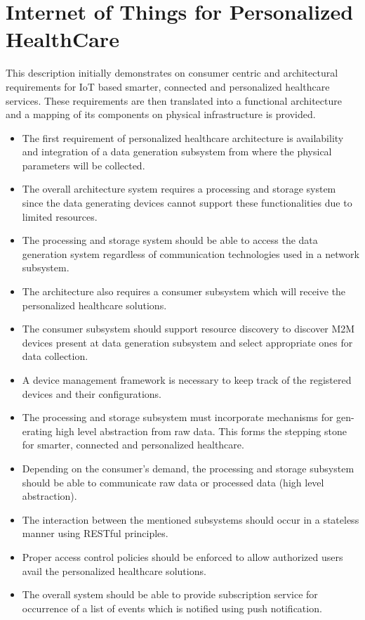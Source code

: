 \section{Internet of Things for Personalized HealthCare}
This description initially demonstrates on consumer centric and architectural
requirements for IoT based smarter, connected and personalized healthcare services.
These requirements are then translated into a functional architecture and a mapping
of its components on physical infrastructure is provided.
\begin{itemize}
\item The first requirement of personalized healthcare architecture is availability and
integration of a data generation subsystem from where the physical parameters
will be collected.
\item  The overall architecture system requires a processing and storage system since
the data generating devices cannot support these functionalities due to limited
resources.
\item  The processing and storage system should be able to access the data generation
system regardless of communication technologies used in a network subsystem.
\item  The architecture also requires a consumer subsystem which will receive the
personalized healthcare solutions.
\item  The consumer subsystem should support resource discovery to discover M2M
devices present at data generation subsystem and select appropriate ones for data
collection.
\item  A device management framework is necessary to keep track of the registered
devices and their configurations.
\item  The processing and storage subsystem must incorporate mechanisms for gen-
erating high level abstraction from raw data. This forms the stepping stone for
smarter, connected and personalized healthcare.
\item  Depending on the consumer’s demand, the processing and storage subsystem
should be able to communicate raw data or processed data (high level
abstraction).
\item  The interaction between the mentioned subsystems should occur in a stateless
manner using RESTful principles.
\item  Proper access control policies should be enforced to allow authorized users avail
the personalized healthcare solutions.
\item  The overall system should be able to provide subscription service for occurrence
of a list of events which is notified using push notification.
\end{itemize}

